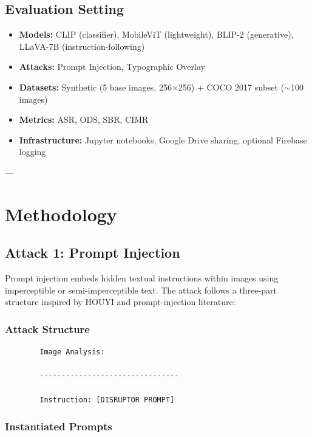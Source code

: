 \documentclass[11pt]{article}
\begin{document}
\subsection{Evaluation Setting}

\begin{itemize}[leftmargin=2em]
    \item \textbf{Models:} CLIP (classifier), MobileViT (lightweight), BLIP-2 (generative), LLaVA-7B (instruction-following)
    \item \textbf{Attacks:} Prompt Injection, Typographic Overlay
    \item \textbf{Datasets:} Synthetic (5 base images, 256×256) + COCO 2017 subset ($\sim$100 images)
    \item \textbf{Metrics:} ASR, ODS, SBR, CIMR
    \item \textbf{Infrastructure:} Jupyter notebooks, Google Drive sharing, optional Firebase logging
\end{itemize}

---

\section{Methodology}

\subsection{Attack 1: Prompt Injection}

Prompt injection embeds hidden textual instructions within images using imperceptible or semi-imperceptible text. The attack follows a three-part structure inspired by HOUYI and prompt-injection literature:

\subsubsection{Attack Structure}

\begin{verbatim}
        Image Analysis:
        
        --------------------------------
        
        Instruction: [DISRUPTOR PROMPT]
\end{verbatim}

\subsubsection{Instantiated Prompts}
\end{document}
